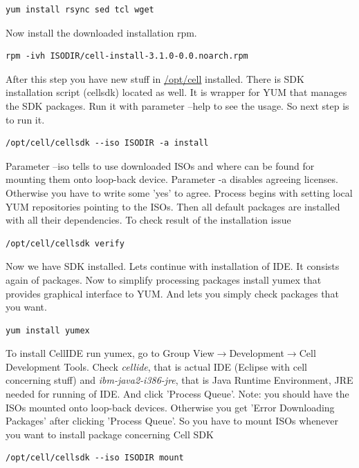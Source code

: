 \begin{verbatim}
yum install rsync sed tcl wget
\end{verbatim}

Now install the downloaded installation rpm.

\begin{verbatim}
rpm -ivh ISODIR/cell-install-3.1.0-0.0.noarch.rpm
\end{verbatim}

After this step you have new stuff in \url{/opt/cell} installed. There is SDK installation script (cellsdk) located as well.
It is wrapper for YUM that manages the SDK packages.
Run it with parameter --help to see the usage.
So next step is to run it.

\begin{verbatim}
/opt/cell/cellsdk --iso ISODIR -a install
\end{verbatim}

Parameter --iso tells to use downloaded ISOs and where can be found for mounting them onto loop-back device.
Parameter -a disables agreeing licenses. Otherwise you have to write some 'yes' to agree.
Process begins with setting local YUM repositories pointing to the ISOs.
Then all default packages are installed with all their dependencies.
To check result of the installation issue

\begin{verbatim}
/opt/cell/cellsdk verify
\end{verbatim}

Now we have SDK installed. Lets continue with installation of IDE.
It consists again of packages.
Now to simplify processing packages install yumex that provides graphical interface to YUM.
And lets you simply check packages that you want.

\begin{verbatim}
yum install yumex
\end{verbatim}

To install CellIDE run yumex, go to Group View$\rightarrow$Development$\rightarrow$Cell Development Tools.
Check \textit{cellide}, that is actual IDE (Eclipse with cell concerning stuff) and \textit{ibm-java2-i386-jre}, that is Java Runtime Environment, JRE needed for running of IDE.
And click 'Process Queue'. Note: you should have the ISOs mounted onto loop-back devices.
Otherwise you get 'Error Downloading Packages' after clicking 'Process Queue'.
So you have to mount ISOs whenever you want to install package concerning Cell SDK

\begin{verbatim}
/opt/cell/cellsdk --iso ISODIR mount
\end{verbatim}

